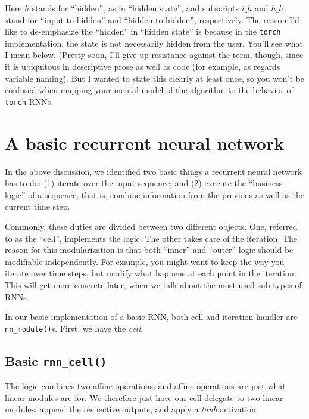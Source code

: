 \documentclass[
  letterpaper,
]{krantz}
\begin{document}
Here \(h\) stands for ``hidden'', as in ``hidden state'', and subscripts
\(i\_h\) and \(h\_h\) stand for ``input-to-hidden'' and
``hidden-to-hidden'', respectively. The reason I'd like to de-emphasize
the ``hidden'' in ``hidden state'' is because in the \texttt{torch}
implementation, the state is not necessarily hidden from the user.
You'll see what I mean below. (Pretty soon, I'll give up resistance
against the term, though, since it is ubiquitous in descriptive prose as
well as code (for example, as regards variable naming). But I wanted to
state this clearly at least once, so you won't be confused when mapping
your mental model of the algorithm to the behavior of \texttt{torch}
RNNs.

\hypertarget{a-basic-recurrent-neural-network}{%
\section{A basic recurrent neural
network}\label{a-basic-recurrent-neural-network}}

In the above discussion, we identified two basic things a recurrent
neural network has to do: (1) iterate over the input sequence; and (2)
execute the ``business logic'' of a sequence, that is, combine
information from the previous as well as the current time step.

Commonly, these duties are divided between two different objects. One,
referred to as the ``cell'', implements the logic. The other takes care
of the iteration. The reason for this modularization is that both
``inner'' and ``outer'' logic should be modifiable independently. For
example, you might want to keep the way you iterate over time steps, but
modify what happens at each point in the iteration. This will get more
concrete later, when we talk about the most-used sub-types of RNNs.

In our basic implementation of a basic RNN, both cell and iteration
handler are \texttt{nn\_module()}s. First, we have the \emph{cell}.

\hypertarget{basic-rnn_cell}{%
\subsection{\texorpdfstring{Basic
\texttt{rnn\_cell()}}{Basic rnn\_cell()}}\label{basic-rnn_cell}}

The logic combines two affine operations; and affine operations are just
what linear modules are for. We therefore just have our cell delegate to
two linear modules, append the respective outputs, and apply a
\emph{tanh} activation.
\end{document}
